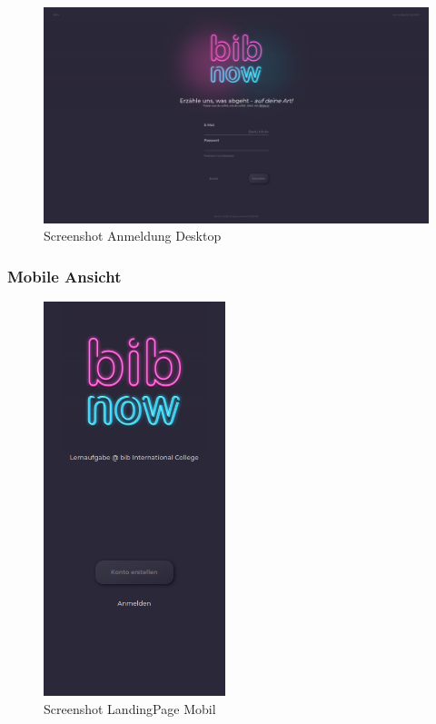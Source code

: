 \documentclass[12pt,titlepage]{article}
\begin{document}
\begin{figure}[hbt!]
\centering
\includegraphics[width=400pt]{screenshots/Screenshot_Desktop3.png}
\caption{Screenshot Anmeldung Desktop}
\end{figure}

\FloatBarrier

\newpage

\subsubsection{Mobile Ansicht}

\begin{figure}[hbt!]
\centering
\includegraphics[width=150pt]{screenshots/Screenshot_Mobil1.png}
\caption{Screenshot LandingPage Mobil}
\end{figure}
\end{document}
